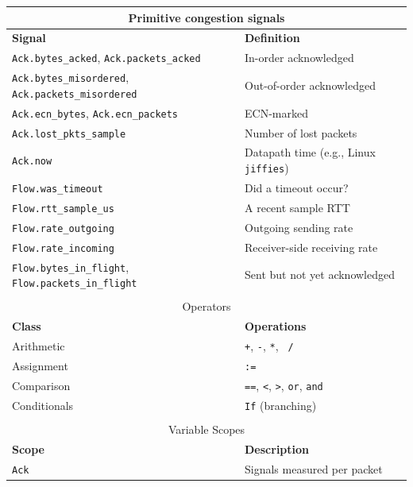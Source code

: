 \begin{table}
    \centering
    \footnotesize
    \begin{tabular}{@{} p{}p{}}
        \hline
        \hline
        \multicolumn{2}{c}{Primitive congestion signals} \\
        \hline
        \hline
        \textbf{Signal} & \textbf{Definition} \\
        \texttt{Ack.bytes\_acked}, \texttt{Ack.packets\_acked} & In-order acknowledged \\
        \texttt{Ack.bytes\_misordered}, \texttt{Ack.packets\_misordered} & Out-of-order acknowledged \\
        \texttt{Ack.ecn\_bytes}, \texttt{Ack.ecn\_packets} & ECN-marked \\
        \texttt{Ack.lost\_pkts\_sample} & Number of lost packets \\
        \texttt{Ack.now} & Datapath time (e.g., Linux \texttt{jiffies})\\
        \texttt{Flow.was\_timeout} & Did a timeout occur? \\
        \texttt{Flow.rtt\_sample\_us} & A recent sample RTT \\
        \texttt{Flow.rate\_outgoing} & Outgoing sending rate \\
        \texttt{Flow.rate\_incoming} & Receiver-side receiving rate  \\
        \texttt{Flow.bytes\_in\_flight}, \texttt{Flow.packets\_in\_flight} & Sent but not yet acknowledged \\
        & \\
        \hline
        \hline
        \multicolumn{2}{c}{Operators} \\
        \hline
        \hline
        \textbf{Class} & \textbf{Operations} \\
        Arithmetic & \texttt{+}, \texttt{-}, \texttt{*}, \texttt{~/} \\
        Assignment & \texttt{:=} \\
        Comparison & \texttt{==}, \texttt{<}, \texttt{>}, \texttt{or}, \texttt{and} \\
        Conditionals & \texttt{If} (branching) \\
        & \\
        \hline
        \hline
        \multicolumn{2}{c}{Variable Scopes} \\
        \hline
        \hline
        \textbf{Scope} & \textbf{Description} \\
        \texttt{Ack} & Signals measured per packet \\

\end{tabular}
\end{table}
